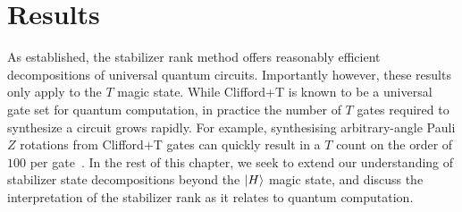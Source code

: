 \section{Results}\label{sec:srank_results}
As established, the stabilizer rank method offers reasonably efficient decompositions of universal quantum circuits. Importantly however, these results only apply to the $T$ magic state. While Clifford+T is known to be a universal gate set for quantum computation, in practice the number of $T$ gates required to synthesize a circuit grows rapidly. For example, synthesising arbitrary-angle Pauli $Z$ rotations from Clifford+T gates can quickly result in a $T$ count on the order of $100$ per gate~\cite{gridsynth,Ross2014}. In the rest of this chapter, we seek to extend our understanding of stabilizer state decompositions beyond the $\ket{H}$ magic state, and discuss the interpretation of the stabilizer rank as it relates to quantum computation.
